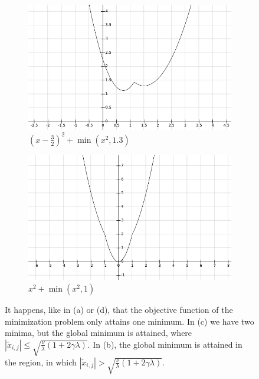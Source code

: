 \documentclass{scrreprt}
\begin{document}
\begin{figure}[!ht]
\begin{subfigure}[b]{0.49\textwidth}
                    \end{subfigure}
                    \begin{subfigure}[b]{0.49\textwidth}
                        \begin{framed}
                            \includegraphics[width=\textwidth]{img/f_4.png}
                            \caption{$(x-\frac{3}{2})^{2} + \min(x^{2}, 1.3)$}
                        \end{framed}
                    \end{subfigure}
                    \begin{subfigure}[b]{0.49\textwidth}
                        \begin{framed}
                            \includegraphics[width=\textwidth]{img/f_5.png}
                            \caption{$x^{2} + \min(x^{2}, 1)$}
                        \end{framed}
                    \end{subfigure}
                    \caption[Plot of the objective function within a minimum function.]{It happens, like in (a) or (d), that the objective function of the minimization problem only attains one minimum. In (c) we have two minima, but the global minimum is attained, where $|\tilde{x}_{i,j}| \le \sqrt{\frac{\nu}{\lambda}(1 + 2\gamma\lambda)}$. In (b), the global minimum is attained in the region, in which $|\tilde{x}_{i,j}| > \sqrt{\frac{\nu}{\lambda}(1 + 2\gamma\lambda)}$.}
                    \label{fig:objective_function}
            \end{figure}
\end{document}
